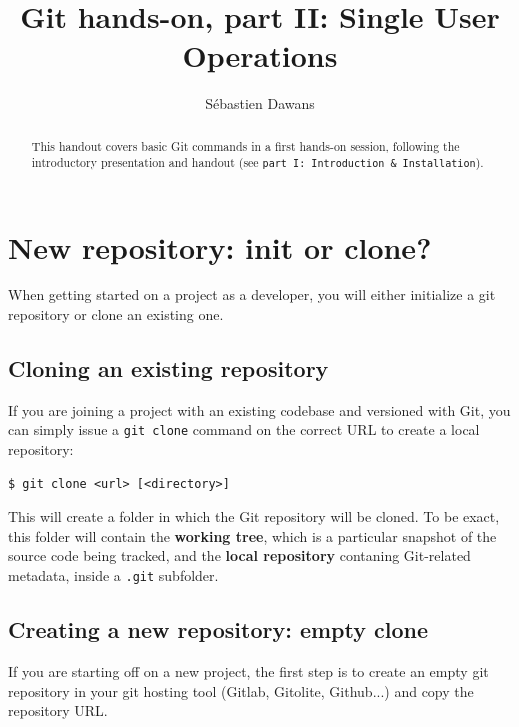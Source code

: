 \documentclass{../common/tufte-latex/tufte-handout}
\title{Git hands-on, part II: Single User Operations}
\author{S\'ebastien Dawans}
\begin{document}
\maketitle%

\begin{abstract}
\noindent
This handout covers basic Git commands in a first hands-on session, following the introductory presentation and handout (see \texttt{part I: Introduction \& Installation}).
\end{abstract}

\section{New repository: init or clone?}

When getting started on a project as a developer, you will either initialize a git repository or clone an existing one.

\subsection{Cloning an existing repository}

If you are joining a project with an existing codebase and versioned with Git, you can simply issue a \texttt{git clone} command on the correct URL to create a local repository: 

\begin{lstlisting}[style=BashInputStyle]
  $ git clone <url> [<directory>]
\end{lstlisting}

This will create a folder in which the Git repository will be cloned.
To be exact, this folder will contain the \textbf{working tree}, which is a particular snapshot of the source code being tracked, and the \textbf{local repository} contaning Git-related metadata, inside a \texttt{.git} subfolder.

\subsection{Creating a new repository: empty clone}

If you are starting off on a new project, the first step is to create an empty git repository in your git hosting tool (Gitlab, Gitolite, Github...) and copy the repository URL.
\end{document}
